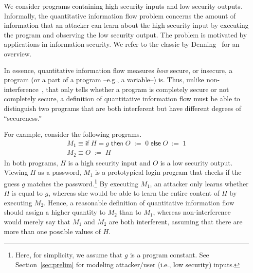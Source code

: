 \documentclass{llncs}
\newcommand{\ttif}[3]{\textsf{if}\;{#1}\;\textsf{then}\;{#2}\;\textsf{else}\;{#3}}
\newcommand{\ttassign}[2]{{#1}\;:=\;{#2}}
\begin{document}
\label{sec:introduction}

We consider programs containing high security inputs and low security
outputs.  Informally, the quantitative information flow problem
concerns the amount of information that an attacker can learn about
the high security input by executing the program and observing the low
security output.  The problem is motivated by applications in
information security.  We refer to the classic by
Denning~\cite{denning82} for an overview.

In essence, quantitative information flow measures {\em how} secure,
or insecure, a program (or a part of a program --e.g., a variable--)
is.  Thus, unlike
non-interference~\cite{DBLP:conf/sosp/Cohen77,goguen:sp1982}, that
only tells whether a program is completely secure or not completely
secure, a definition of quantitative information flow must be able to
distinguish two programs that are both interferent but have different
degrees of ``secureness.''

For example, consider the following programs.
\[
\begin{array}{l}
M_1 \equiv \ttif{H = g}{\ttassign{O}{0}}{\ttassign{O}{1}} \\
M_2 \equiv \ttassign{O}{H}
\end{array}
\]
In both programs, $H$ is a high security input and $O$ is a low
security output.  Viewing $H$ as a password, $M_1$ is a prototypical
login program that checks if the guess $g$ matches the
password.\footnote{Here, for simplicity, we assume that $g$ is a
  program constant.  See Section~\ref{sec:prelim} for modeling
  attacker/user (i.e., low security) inputs.}  By executing $M_1$, an
attacker only learns whether $H$ is equal to $g$, whereas she would be
able to learn the entire content of $H$ by executing $M_2$.  Hence, a
reasonable definition of quantitative information flow should assign a
higher quantity to $M_2$ than to $M_1$, whereas non-interference would
merely say that $M_1$ and $M_2$ are both interferent, assuming that
there are more than one possible values of $H$.
\end{document}
